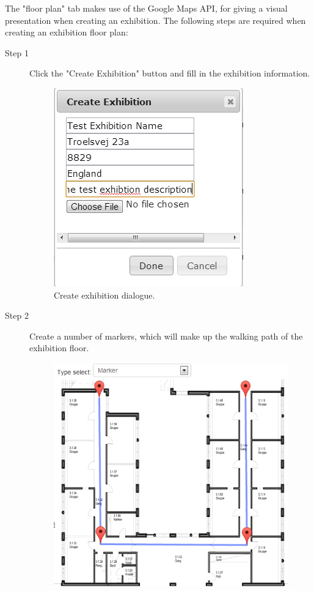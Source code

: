 The "floor plan" tab makes use of the Google Maps API, for giving a visual presentation when creating an exhibition.
The following steps are required when creating an exhibition floor plan:
\begin{description}
	\item[Step 1] Click the "Create Exhibition" button and fill in the exhibition information.
	\begin{figure}[H]
		\centering
		\includegraphics[width=\linewidth]{img/website/step2.png}
		\caption{Create exhibition dialogue.\label{fig:websitestep1}}
	\end{figure}
	\item[Step 2] Create a number of markers, which will make up the walking path of the exhibition floor.
	\begin{figure}[H]
		\centering
		\includegraphics[width=\linewidth]{img/website/step3.png}

\end{figure}
\end{description}
